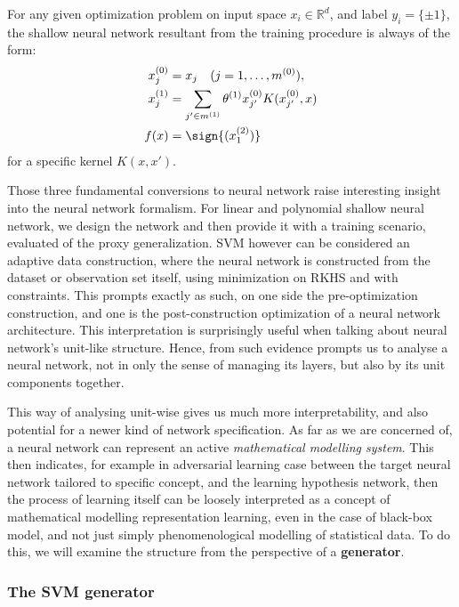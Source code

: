 \documentclass[
  journal=largetwo,
  year=2025,
  volume=37,
]{cup-journal}
\begin{document}
\begin{setting}
    For any given optimization problem on input space $x_{i}\in \mathbb{R}^{d}$, and label $y_{i}=\{\pm 1\}$, the shallow neural network resultant from the training procedure is always of the form:
    \begin{align}
        x_{j}^{(0)} &= x_{j} \quad (j=1,\dots,m^{(0)}),\\ 
        x_{j}^{(1)} &= \sum_{j'\in m^{(1)}} \theta^{(1)}x_{j'}^{(0)}K(x_{j'}^{(0)},x)\\
        f(x) & = \sign{(x_{1}^{(2)}) }
    \end{align}
    for a specific kernel $K(x,x')$. 
\end{setting}

Those three fundamental conversions to neural network raise interesting insight into the neural network formalism. For linear and polynomial shallow neural network, we design the network and then provide it with a training scenario, evaluated of the proxy generalization. SVM however can be considered an adaptive data construction, where the neural network is constructed from the dataset or observation set itself, using minimization on RKHS and with constraints. This prompts exactly as such, on one side the pre-optimization construction, and one is the post-construction optimization of a neural network architecture. This interpretation is surprisingly useful when talking about neural network's unit-like structure. Hence, from such evidence prompts us to analyse a neural network, not in only the sense of managing its layers, but also by its unit components together. 

This way of analysing unit-wise gives us much more interpretability, and also potential for a newer kind of network specification. As far as we are concerned of, a neural network can represent an active \textit{mathematical modelling system}. This then indicates, for example in adversarial learning case between the target neural network tailored to specific concept, and the learning hypothesis network, then the process of learning itself can be loosely interpreted as a concept of mathematical modelling representation learning, even in the case of black-box model, and not just simply phenomenological modelling of statistical data. To do this, we will examine the structure from the perspective of a \textbf{generator}.

\subsubsection{The SVM generator}
\end{document}
